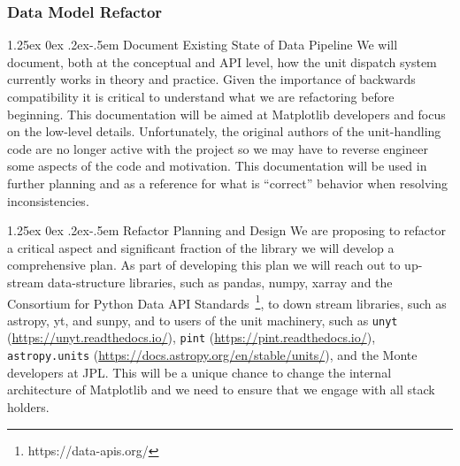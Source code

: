 \documentclass[12pt]{article}
\makeatletter
\numberwithin{page}{section}
\renewcommand{\paragraph}{%
  \@startsection{paragraph}{4}%
  {\z@}{1.25ex \@plus 0ex \@minus .2ex}{-.5em}%
  {\normalfont\normalsize\itshape\bfseries}%
}
\makeatother
\begin{document}
\subsubsection{Data Model Refactor}

\paragraph{Document Existing State of Data Pipeline} We will document, both at the conceptual and API level, how the unit
dispatch system currently works in theory and practice.  Given the
importance of backwards compatibility it is critical to understand
what we are refactoring before beginning.  This documentation will be
aimed at Matplotlib developers and focus on the low-level details.
Unfortunately, the original authors of the unit-handling code are no
longer active with the project so we may have to reverse engineer some
aspects of the code and motivation.  This documentation will be used
in further planning and as a reference for what is ``correct''
behavior when resolving inconsistencies.



\paragraph{Refactor Planning and Design} We are proposing to refactor a critical aspect and significant
fraction of the library we will develop a comprehensive plan.  As part
of developing this plan we will reach out to up-stream data-structure
libraries, such as pandas, numpy, xarray and the Consortium for Python
Data API Standards~\footnote{https://data-apis.org/}, to down stream
libraries, such as astropy, yt, and sunpy, and to users of the unit
machinery, such as \texttt{unyt}
(\url{https://unyt.readthedocs.io/}), \texttt{pint}
(\url{https://pint.readthedocs.io/}), \texttt{astropy.units}
(\url{https://docs.astropy.org/en/stable/units/}), and the Monte
developers at JPL.  This will be a unique chance to change the
internal architecture of Matplotlib and we need to ensure that we
engage with all stack holders.
\end{document}
